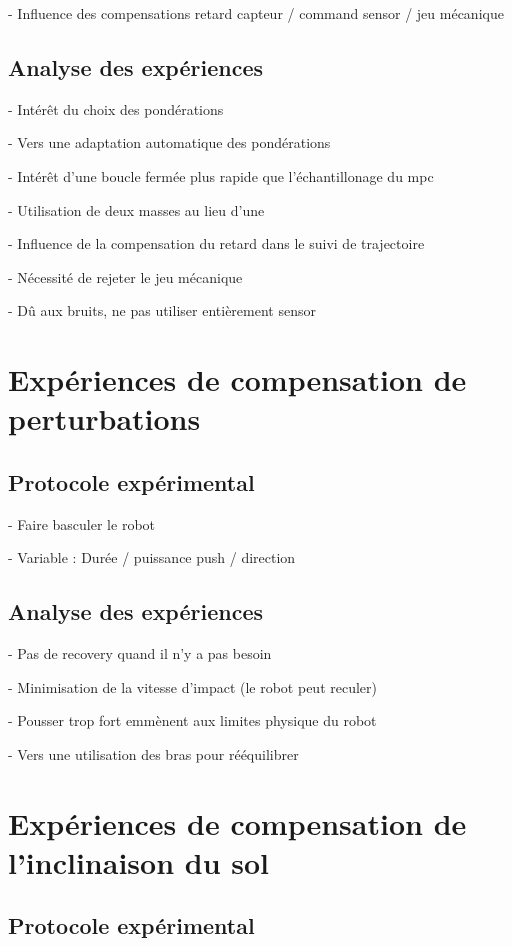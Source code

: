 			- Influence des compensations retard capteur / command sensor / jeu mécanique 
		
		\subsection{Analyse des expériences}
		
			- Intérêt du choix des pondérations
			
			- Vers une adaptation automatique des pondérations
			
			- Intérêt d'une boucle fermée plus rapide que l'échantillonage du mpc
			
			- Utilisation de deux masses au lieu d'une
			
			- Influence de la compensation du retard dans le suivi de trajectoire
			
			- Nécessité de rejeter le jeu mécanique
			
			- Dû aux bruits, ne pas utiliser entièrement sensor
		
	\section{Expériences de compensation de perturbations}
		\subsection{Protocole expérimental}
		
			- Faire basculer le robot
			
			- Variable : Durée / puissance push / direction
			
		\subsection{Analyse des expériences}
		
			- Pas de recovery quand il n'y a pas besoin
			
			- Minimisation de la vitesse d'impact (le robot peut reculer)
		
			- Pousser trop fort emmènent aux limites physique du robot
			
			- Vers une utilisation des bras pour rééquilibrer
		
		
	\section{Expériences de compensation de l'inclinaison du sol}
		\subsection{Protocole expérimental}
		
